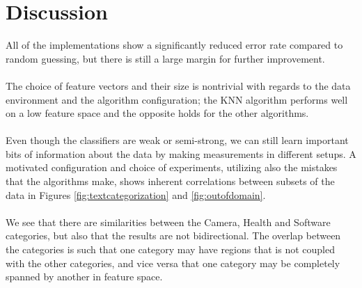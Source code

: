 
\section{Discussion}
All of the implementations show a significantly reduced error rate compared to random guessing, but there is still a large margin for further improvement.
\\\\
The choice of feature vectors and their size is nontrivial with regards to the data environment and the algorithm configuration; the KNN algorithm performs well on a low feature space and the opposite holds for the other algorithms.
\\\\
Even though the classifiers are weak or semi-strong, we can still learn important bits of information about the data by making measurements in different setups. A motivated configuration and choice of experiments, utilizing also the mistakes that the algorithms make, shows inherent correlations between subsets of the data in Figures \ref{fig:textcategorization} and \ref{fig:outofdomain}.
\\\\
We see that there are similarities between the Camera, Health and Software categories, but also that the results are not bidirectional. The overlap between the categories is such that one category may have regions that is not coupled with the other categories, and vice versa that one category may be completely spanned by another in feature space.

